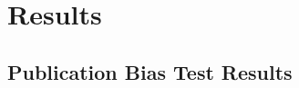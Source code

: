 \documentclass[11pt,a4paper,twoside]{book}\usepackage[]{graphicx}\usepackage[]{color}
\begin{document}





































\chapter{Results} \label{ch:Results}


\section{Publication Bias Test Results} \label{sec:publication.bias.tests}
\end{document}
